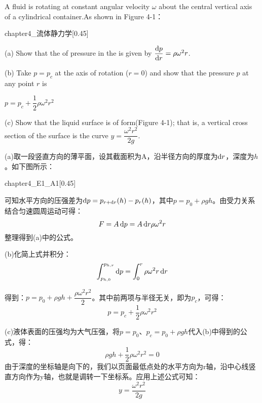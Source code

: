 \chapter[流体力学]{}
\begin{solution}[流体静力学]
	A fluid is rotating at constant angular velocity $\omega$ about the central vertical axis of a cylindrical container.As shown in Figure 4-1：
	\begin{singlefigure}[流体静力学]{chapter4_流体静力学}[0.45]
	\end{singlefigure}
	
	(a) Show that the  of pressure in the  is given by $\dfrac{\dif p}{\dif r}=\rho \omega^2 r$.
	
	(b) Take $p=p_c$ at the axis of rotation ($r=0$) and show that the pressure $p$ at any point $r$ is
	\begin{center}
		$p=p_c+\dfrac{1}{2}\rho\omega^2 r^2$
	\end{center}
	
	(c) Show that the liquid surface is of  form(Figure 4-1); that is, a vertical cross section of the surface is the curve $y=\dfrac{\omega^2 r^2}{2g}$.
	
	\tcbrule
	
    (a)取一段竖直方向的薄平面，设其截面积为A，沿半径方向的厚度为$\dif r$，深度为$h$。如下图所示：
    \begin{singlefigure}[A-4-1]{chapter4_E1_A1}[0.45]
    \end{singlefigure}

    可知水平方向的压强差为$\dif p=p_{r+\dif r}(h)-p_r(h)$，其中$p=p_0+\rho gh$。由受力关系结合匀速圆周运动可得：
        \[F=A\dif p=A\dif r \rho \omega^2 r\]
    整理得到(a)中的公式。
    
    (b)化简上式并积分：
        \[\int_{p_{h,0}}^{p_{h,r}}\dif p=\int_{0}^{r}\rho \omega^2 r\dif r\]

    得到：$p=p_0+\rho gh+\dfrac{\rho \omega^2 r^2}{2}$。其中前两项与半径无关，即为$p_c$，可得：
        \[p=p_c+\dfrac{1}{2}\rho \omega^2 r^2\]
        
    (c)液体表面的压强均为大气压强，将$p=p_0$、$p_c=p_0+\rho gh$代入(b)中得到的公式，得：
        \[\rho gh+\dfrac{1}{2}\rho \omega^2 r^2=0\]
    由于深度的坐标轴是向下的，我们以页面最低点处的水平方向为r轴，沿中心线竖直方向作为y轴，也就是调转一下坐标系。应用上述公式可知：
        \[y=\dfrac{\omega^2 r^2}{2g}\]
\end{solution}

